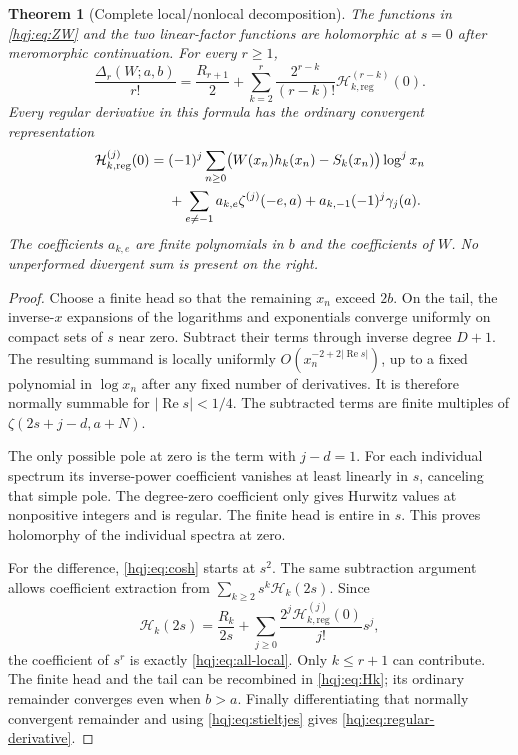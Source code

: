 \documentclass[11pt,letterpaper]{article}
\numberwithin{equation}{section}
\newtheorem{theorem}{Theorem}[section]
\theoremstyle{definition}
\newcommand{\Rea}{\operatorname{Re}}
\begin{document}
\begin{theorem}[Complete local/nonlocal decomposition]\label{hqj:thm:local}
The functions in \eqref{hqj:eq:ZW} and the two linear-factor functions are
holomorphic at $s=0$ after meromorphic continuation. For every $r\ge1$,
\begin{equation}\label{hqj:eq:all-local}
\boxed{\quad
\frac{\Delta_r(W;a,b)}{r!}
=\frac{R_{r+1}}2+
\sum_{k=2}^r\frac{2^{r-k}}{(r-k)!}
\mathcal H_{k,\mathrm{reg}}^{(r-k)}(0).
\quad}
\end{equation}
Every regular derivative in this formula has the ordinary convergent
representation
\begin{align}
\mathcal H_{k,\mathrm{reg}}^{(j)}(0)
={}&(-1)^j\sum_{n\ge0}\bigl(W(x_n)h_k(x_n)-S_k(x_n)\bigr)\log^j x_n
\notag\\
&+\sum_{e\ne-1}a_{k,e}\zeta^{(j)}(-e,a)
+a_{k,-1}(-1)^j\gamma_j(a).
\label{hqj:eq:regular-derivative}
\end{align}
The coefficients $a_{k,e}$ are finite polynomials in $b$ and the
coefficients of $W$. No unperformed divergent sum is present on the right.
\end{theorem}
\begin{proof}
Choose a finite head so that the remaining $x_n$ exceed $2b$. On the tail,
the inverse-$x$ expansions of the logarithms and exponentials converge
uniformly on compact sets of $s$ near zero. Subtract their terms through
inverse degree $D+1$. The resulting summand is locally uniformly
$O(x_n^{-2+2|\Rea s|})$, up to a fixed polynomial in $\log x_n$ after
any fixed number of derivatives. It is therefore normally summable for
$|\Rea s|<1/4$. The subtracted terms are finite multiples of
$\zeta(2s+j-d,a+N)$.

The only possible pole at zero is the term with $j-d=1$.
For each individual spectrum its inverse-power coefficient vanishes at
least linearly in $s$, canceling that simple pole. The degree-zero
coefficient only gives Hurwitz values at nonpositive integers and is
regular. The finite head is entire in $s$. This proves holomorphy of
the individual spectra at zero.

For the difference, \eqref{hqj:eq:cosh} starts at $s^2$. The same
subtraction argument allows coefficient extraction from
$\sum_{k\ge2}s^k\mathcal H_k(2s)$. Since
\[
\mathcal H_k(2s)=\frac{R_k}{2s}
+\sum_{j\ge0}\frac{2^j\mathcal H_{k,\mathrm{reg}}^{(j)}(0)}{j!}s^j,
\]
the coefficient of $s^r$ is exactly \eqref{hqj:eq:all-local}.
Only $k\le r+1$ can contribute. The finite head and the tail can be
recombined in \eqref{hqj:eq:Hk}; its ordinary remainder converges even
when $b>a$. Finally differentiating that normally convergent remainder
and using \eqref{hqj:eq:stieltjes} gives
\eqref{hqj:eq:regular-derivative}.
\end{proof}
\end{document}
